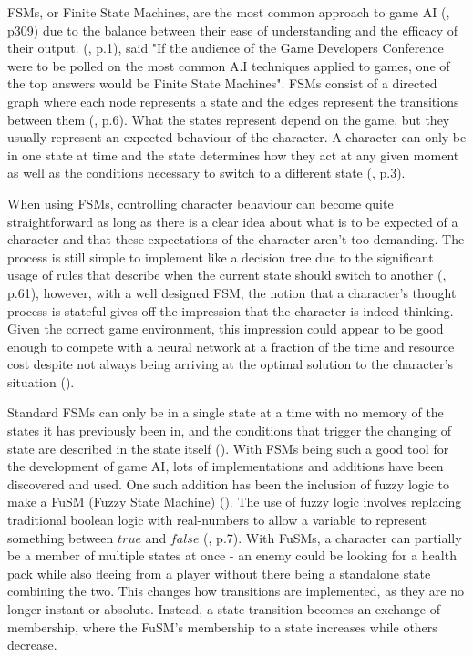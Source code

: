 \documentclass[10pt]{article}
\begin{document}
FSMs, or Finite State Machines, are the most common approach to game AI (\cite{millington2019ai}, p309) due to the balance between their ease of understanding and the efficacy of their output. \citeauthor{orkin2006three} (\citeyear{orkin2006three}, p.1), said "If the audience of the Game Developers Conference were to be polled on the most common A.I techniques applied to games, one of the top answers would be Finite State Machines". FSMs consist of a directed graph where each node represents a state and the edges represent the transitions between them (\cite{tozour2002evolution}, p.6). What the states represent depend on the game, but they usually represent an expected behaviour of the character. A character can only be in one state at time and the state determines how they act at any given moment as well as the conditions necessary to switch to a different state (\cite{diller2004behavior}, p.3).

When using FSMs, controlling character behaviour can become quite straightforward as long as there is a clear idea about what is to be expected of a character and that these expectations of the character aren't too demanding. The process is still simple to implement like a decision tree due to the significant usage of rules that describe when the current state should switch to another (\cite{nareyek2004ai}, p.61), however, with a well designed FSM, the notion that a character's thought process is stateful gives off the impression that the character is indeed thinking. Given the correct game environment, this impression could appear to be good enough to compete with a neural network at a fraction of the time and resource cost despite not always being arriving at the optimal solution to the character's situation (\cite{sweetser2002current}).

Standard FSMs can only be in a single state at a time with no memory of the states it has previously been in, and the conditions that trigger the changing of state are described in the state itself (\cite{colledanchise2014performance}). With FSMs being such a good tool for the development of game AI, lots of implementations and additions have been discovered and used. One such addition has been the inclusion of fuzzy logic to make a FuSM (Fuzzy State Machine) (\cite{sweetser2002current}). The use of fuzzy logic involves replacing traditional boolean logic with real-numbers to allow a variable to represent something between $true$ and $false$ (\cite{tozour2002evolution}, p.7). With FuSMs, a character can partially be a member of multiple states at once - an enemy could be looking for a health pack while also fleeing from a player without there being a standalone state combining the two. This changes how transitions are implemented, as they are no longer instant or absolute. Instead, a state transition becomes an exchange of membership, where the FuSM's membership to a state increases while others decrease.
\end{document}

